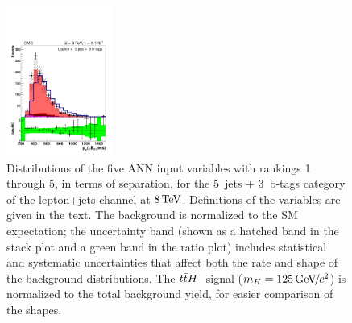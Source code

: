 \begin{figure}[hbtp]
\begin{center}
   \includegraphics[width=0.31\textwidth]{Figures/Analysis_1_Diagrams/d2MCPlots_all_sum_pt_incl_met_cut5_j5_t3_Combined_HtWgt.pdf}
   \hspace{0.055\textwidth}
   \caption{Distributions of the five ANN input variables with
   rankings 1 through 5, in terms of separation, for the 5~jets +
   3~b-tags category of the lepton+jets channel at $8
   \,\text{Te\hspace{-.08em}V}$. Definitions of the variables are given in the text. The 
   background is normalized to the SM expectation; the
   uncertainty band (shown as a hatched band in the stack plot and a
   green band in the ratio plot) includes statistical and systematic
   uncertainties that affect both the rate and shape of the background
   distributions.  The $t{\bar{t}}H~$ signal ($m_{H} = 125 {\,\text{Ge\hspace{-.08em}V\hspace{-0.16em}/\hspace{-0.08em}}c^\text{2}}$) is
   normalized to the total background yield, for easier comparison of
   the shapes.} 
   \label{fig:lj_input_5j_3t_part1} \end{center}
\end{figure}

\clearpage

